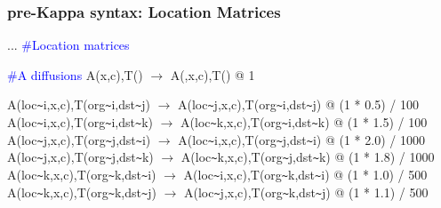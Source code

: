 \documentclass[xcolor=dvipsnames]{beamer}
\def\int{\hbox{\texttt{\~}}}
\begin{document}
\begin{frame}
  \frametitle{pre-Kappa syntax: Location Matrices}
  \begin{flushleft} {\scriptsize
    ... \newline
    \textcolor{blue}{\#Location matrices} \newline
     \pause
    \item \textcolor{blue}{\#A diffusions} \newline
     A(x,c),T() $\rightarrow$ A(,x,c),T() @ 1 \pause
    \item {} \newline
    A(loc\int i,x,c),T(org\int i,dst\int j) $\rightarrow$ A(loc\int j,x,c),T(org\int i,dst\int j) @ (1 * 0.5) / 100 \newline
    A(loc\int i,x,c),T(org\int i,dst\int k) $\rightarrow$ A(loc\int k,x,c),T(org\int i,dst\int k) @ (1 * 1.5) / 100 \newline
    A(loc\int j,x,c),T(org\int j,dst\int i) $\rightarrow$ A(loc\int i,x,c),T(org\int j,dst\int i) @ (1 * 2.0) / 1000 \newline
    A(loc\int j,x,c),T(org\int j,dst\int k) $\rightarrow$ A(loc\int k,x,c),T(org\int j,dst\int k) @ (1 * 1.8) / 1000 \newline
    A(loc\int k,x,c),T(org\int k,dst\int i) $\rightarrow$ A(loc\int i,x,c),T(org\int k,dst\int i) @ (1 * 1.0) / 500 \newline
    A(loc\int k,x,c),T(org\int k,dst\int j) $\rightarrow$ A(loc\int j,x,c),T(org\int k,dst\int j) @ (1 * 1.1) / 500 \newline }
  \end{flushleft}
\end{frame}
\end{document}
